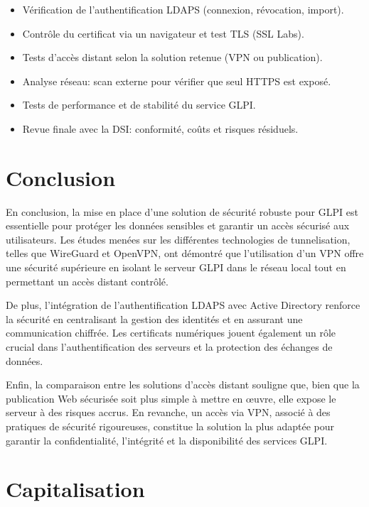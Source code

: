 \begin{itemize}
  \item Vérification de l'authentification LDAPS (connexion, révocation, import).
  \item Contrôle du certificat via un navigateur et test TLS (SSL Labs).
  \item Tests d'accès distant selon la solution retenue (VPN ou publication).
  \item Analyse réseau: scan externe pour vérifier que seul HTTPS est exposé.
  \item Tests de performance et de stabilité du service GLPI.
  \item Revue finale avec la DSI: conformité, coûts et risques résiduels.
\end{itemize}

\newpage 
\section*{Conclusion}

\noindent En conclusion, la mise en place d'une solution de sécurité robuste pour GLPI est essentielle pour protéger les données sensibles et garantir un accès sécurisé aux utilisateurs. Les études menées sur les différentes technologies de tunnelisation, telles que WireGuard et OpenVPN, ont démontré que l'utilisation d'un VPN offre une sécurité supérieure en isolant le serveur GLPI dans le réseau local tout en permettant un accès distant contrôlé. 

\noindent De plus, l'intégration de l'authentification LDAPS avec Active Directory renforce la sécurité en centralisant la gestion des identités et en assurant une communication chiffrée. Les certificats numériques jouent également un rôle crucial dans l'authentification des serveurs et la protection des échanges de données.

\noindent Enfin, la comparaison entre les solutions d'accès distant souligne que, bien que la publication Web sécurisée soit plus simple à mettre en œuvre, elle expose le serveur à des risques accrus. En revanche, un accès via VPN, associé à des pratiques de sécurité rigoureuses, constitue la solution la plus adaptée pour garantir la confidentialité, l'intégrité et la disponibilité des services GLPI.

\newpage

\section*{Capitalisation}

